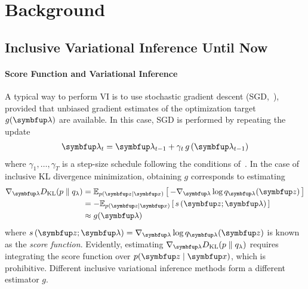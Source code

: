 
\section{Background}
\vspace{-0.05in}
\subsection{Inclusive Variational Inference Until Now}\label{section:ivi_previous}
\vspace{-0.05in}
\paragraph{Score Function and Variational Inference}
A typical way to perform VI is to use stochastic gradient descent (SGD,~\citealt{robbins_stochastic_1951, bottou_online_1999}), provided that unbiased gradient estimates of the optimization target \(g(\vlambda)\) are available.
In this case, SGD is performed by repeating the update
\vspace{-0.02in}
\begin{align}
  \vlambda_{t} = \vlambda_{t-1} + \gamma_{t} \, g\left(\vlambda_{t-1}\right)
\end{align}
where \(\gamma_1, \ldots, \gamma_T\) is a step-size schedule following the conditions of~\citet{robbins_stochastic_1951, bottou_online_1999}.
In the case of inclusive KL divergence minimization, obtaining \(g\) corresponds to estimating
%
\vspace{-0.02in}
\begin{align}
  \nabla_{\vlambda} \DKL{p}{q_{\lambda}}
  &= \Esub{p(\vz\mid\vx)}{ - \nabla_{\vlambda} \log q_{\vlambda}(\vz) } \\
  &= - \Esub{p(\vz\mid\vx)}{ s\,(\vz; \vlambda) } \\
  &\approx g(\vlambda)
\end{align}
%
where \(s\,(\vz; \vlambda) = \nabla_{\vlambda} \log q_{\vlambda}(\vz)\) is known as the \textit{score function}.
Evidently, estimating \(\nabla_{\vlambda} \DKL{p}{q_{\lambda}}\) requires integrating the score function over \(p(\vz\mid\vx)\), which is prohibitive.
Different inclusive variational inference methods form a different estimator \(g\).

\vspace{-0.05in}
